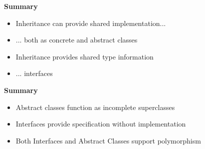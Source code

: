 \documentclass{beamer}
\begin{document}
\begin{frame}
\begin{center}
\textbf{Summary}
\end{center}
\begin{itemize}
\item Inheritance can provide shared implementation...
\item ... both as concrete and abstract classes
\item Inheritance provides shared type information
\item ... interfaces
\end{itemize}
\end{frame}

\begin{frame}
\begin{center}
\textbf{Summary}
\end{center}
\begin{itemize}
\item Abstract classes function as incomplete superclasses
\item Interfaces provide specification without implementation
\bigskip
\item Both Interfaces and Abstract Classes support polymorphism
\end{itemize}
\end{frame}
\end{document}
